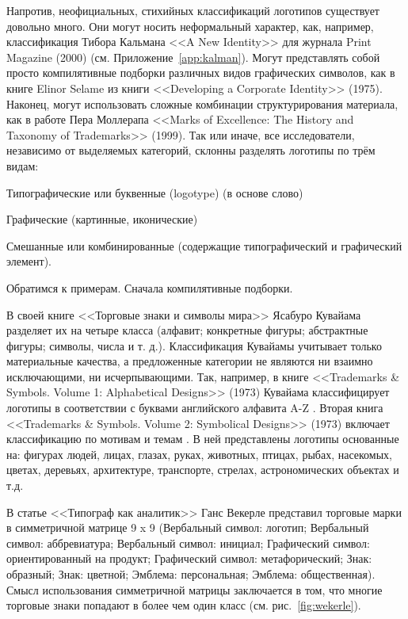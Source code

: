 Напротив, неофициальных, стихийных классификаций логотипов существует довольно много. Они могут
носить неформальный характер, как, например, классификация Тибора Кальмана <<A New Identity>> для
журнала Print Magazine (2000) (см. Приложение~\ref{app:kalman}). Могут представлять собой
просто компилятивные подборки различных
видов графических символов, как в книге Elinor Selame из книги <<Developing a Corporate Identity>>
(1975). Наконец, могут использовать сложные комбинации структурирования материала, как в работе Пера
Моллерапа <<Marks of Excellence: The History and Taxonomy of Trademarks>> (1999). Так или иначе, все
исследователи, независимо от выделяемых категорий, склонны разделять логотипы по трём видам:
\begin{enumerate*}[label=\arabic*)]
\item Типографические или буквенные (logotype) (в основе слово)
\item Графические (картинные, иконические)
\item Смешанные или комбинированные (содержащие типографический и графический элемент).
\end{enumerate*}

Обратимся к примерам. Сначала компилятивные подборки.

В своей книге <<Торговые знаки и символы мира>> Ясабуро Кувайама разделяет их на четыре класса
(алфавит; конкретные фигуры; абстрактные фигуры; символы, числа и т. д.). Классификация Кувайамы
учитывает только материальные качества, а предложенные категории не являются ни взаимно
исключающими, ни исчерпывающими. Так, например, в книге <<Trademarks \& Symbols. Volume 1:
Alphabetical Designs>> (1973) Кувайама классифицирует логотипы в соответствии с буквами английского
алфавита A-Z \autocite[][5]{kuwayama1973alphabetical}.
Вторая книга <<Trademarks \& Symbols. Volume 2: Symbolical Designs>> (1973) включает
классификацию по мотивам и темам \autocite[][5]{kuwayama1973trademarks}.
В ней представлены логотипы основанные на: фигурах людей, лицах, глазах, руках, животных, птицах, рыбах, насекомых, цветах, деревьях, архитектуре, транспорте, стрелах, астрономических объектах и т.д.

В статье <<Типограф как аналитик>> Ганс Векерле\autocite{weckerle1968typographer} представил торговые марки в
симметричной матрице 9 x 9 (Вербальный символ: логотип; Вербальный символ: аббревиатура; Вербальный
символ: инициал; Графический символ: ориентированный на продукт; Графический символ: метафорический;
Знак: образный; Знак: цветной; Эмблема: персональная; Эмблема: общественная). Смысл использования
симметричной матрицы заключается в том, что многие торговые знаки попадают в более чем один
класс (см. рис.~\ref{fig:wekerle}).


